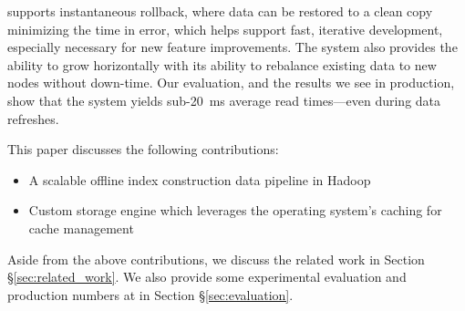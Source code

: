 \projectname{} supports instantaneous rollback, where data can be
restored to a clean copy minimizing the time in error, which helps
support fast, iterative development, especially necessary for new
feature improvements. The system also provides the ability to grow
horizontally with its ability to rebalance existing data to new nodes
without down-time. Our evaluation, and the results we see in production, 
show that the system yields sub-20~ms average read times---even during data
refreshes. 

This paper discusses the following contributions:

\begin{itemize}
	\item A scalable offline index construction data pipeline in Hadoop
        \item Custom storage engine which leverages the operating system's 
caching for cache management
\end{itemize}

Aside from the above contributions, we discuss the related work in Section 
\S\ref{sec:related_work}. We also provide some experimental evaluation and
production numbers at \linkedin{} in Section \S\ref{sec:evaluation}.

